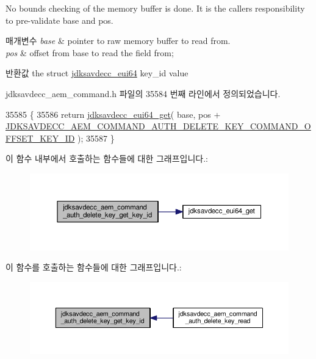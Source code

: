 No bounds checking of the memory buffer is done. It is the caller\textquotesingle{}s responsibility to pre-\/validate base and pos.


\begin{DoxyParams}{매개변수}
{\em base} & pointer to raw memory buffer to read from. \\
\hline
{\em pos} & offset from base to read the field from; \\
\hline
\end{DoxyParams}
\begin{DoxyReturn}{반환값}
the struct \hyperlink{structjdksavdecc__eui64}{jdksavdecc\+\_\+eui64} key\+\_\+id value 
\end{DoxyReturn}


jdksavdecc\+\_\+aem\+\_\+command.\+h 파일의 35584 번째 라인에서 정의되었습니다.


\begin{DoxyCode}
35585 \{
35586     \textcolor{keywordflow}{return} \hyperlink{group__eui64_ga2652311a25a6b91cddbed75c108c7031}{jdksavdecc\_eui64\_get}( base, pos + 
      \hyperlink{group__command__auth__delete__key_ga5382aaa8b985c51d5c11cd66cb482212}{JDKSAVDECC\_AEM\_COMMAND\_AUTH\_DELETE\_KEY\_COMMAND\_OFFSET\_KEY\_ID}
       );
35587 \}
\end{DoxyCode}


이 함수 내부에서 호출하는 함수들에 대한 그래프입니다.\+:
\nopagebreak
\begin{figure}[H]
\begin{center}
\leavevmode
\includegraphics[width=350pt]{group__command__auth__delete__key_ga1e3fbeba2601084ac4105dec73835133_cgraph}
\end{center}
\end{figure}




이 함수를 호출하는 함수들에 대한 그래프입니다.\+:
\nopagebreak
\begin{figure}[H]
\begin{center}
\leavevmode
\includegraphics[width=350pt]{group__command__auth__delete__key_ga1e3fbeba2601084ac4105dec73835133_icgraph}
\end{center}
\end{figure}


